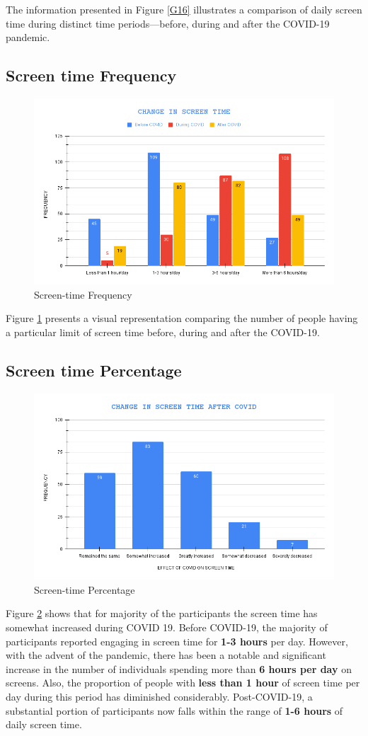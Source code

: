 The information presented in Figure \ref{G16} illustrates a comparison of daily screen time during distinct time periods—before, during and after the COVID-19 pandemic.

\subsection{Screen time Frequency}

\begin{figure}[h!]
	\centering
	\includegraphics[width=0.75\linewidth]{IMAGES/Image 17.png}
	\caption{Screen-time Frequency}
	\label{G17}
\end{figure}


Figure \ref{G17} presents a visual representation comparing the number of people having a particular limit of screen time before, during and after the COVID-19.

\newpage 

\subsection{Screen time Percentage}

\begin{figure}[h!]
	\centering
	\includegraphics[width=0.79\linewidth]{IMAGES/Image 18.png}
	\caption{Screen-time Percentage}
	\label{G18}
\end{figure}
Figure \ref{G18} shows that for majority of the participants the screen time has somewhat increased during COVID 19. Before COVID-19, the majority of participants reported engaging in screen time for \textbf{1-3 hours} per day. However, with the advent of the pandemic, there has been a notable and significant increase in the number of individuals spending more than \textbf{6 hours per day} on screens. Also, the proportion of people with \textbf{less than 1 hour} of screen time per day during this period has diminished considerably. Post-COVID-19, a substantial portion of participants now falls within the range of \textbf{1-6 hours} of daily screen time.

